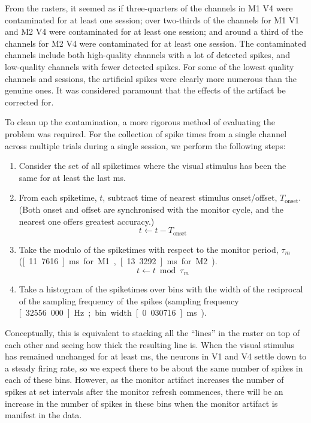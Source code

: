 From the rasters, it seemed as if three-quarters of the channels in \ac{M1} \ac{V4} were contaminated for at least one session; over two-thirds of the channels for \ac{M1} \ac{V1} and \ac{M2} \ac{V4} were contaminated for at least one session; and around a third of the channels for \ac{M2} \ac{V4} were contaminated for at least one session. The contaminated channels include both high-quality channels with a lot of detected spikes, and low-quality channels with fewer detected spikes. For some of the lowest quality channels and sessions, the artificial spikes were clearly more numerous than the genuine ones. It was considered paramount that the effects of the artifact be corrected for.

To clean up the contamination, a more rigorous method of evaluating the problem was required.
For the collection of spike times from a single channel across multiple trials during a single session, we perform the following steps:
\begin{enumerate}
\item Consider the set of all spiketimes where the visual stimulus has been the same for at least the last \unit[150]{ms}.
\item From each spiketime, $t$, subtract time of nearest stimulus onset/offset, $T_{\text{onset}}$. (Both onset and offset are synchronised with the monitor cycle, and the nearest one offers greatest accuracy.)
$$
t \leftarrow t - T_{\text{onset}}
$$
\item Take the modulo of the spiketimes with respect to the monitor period, $\tau_m$ (\unit[11.7616]{ms} for \ac{M1}, \unit[13.3292]{ms} for \ac{M2}).
$$
t \leftarrow t \bmod \tau_m
$$
\item Take a histogram of the spiketimes over bins with the width of the reciprocal of the sampling frequency of the spikes (sampling frequency \unit[32556.000]{Hz}; bin width \unit[0.030716]{ms}).
\end{enumerate}
Conceptually, this is equivalent to stacking all the ``lines'' in the raster on top of each other and seeing how thick the resulting line is.
When the visual stimulus has remained unchanged for at least \unit[150]{ms}, the neurons in \ac{V1} and \ac{V4} settle down to a steady firing rate, so we expect there to be about the same number of spikes in each of these bins. However, as the monitor artifact increases the number of spikes at set intervals after the monitor refresh commences, there will be an increase in the number of spikes in these bins when the monitor artifact is manifest in the data.

